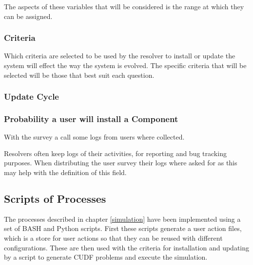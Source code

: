 The aspects of these variables that will be considered is the range at which they can be assigned.

\subsubsection{Criteria}
Which criteria are selected to be used by the resolver to install or update the system will effect the way the system is evolved.
The specific criteria that will be selected will be those that best suit each question. 


\subsubsection{Update Cycle}



\subsubsection{Probability a user will install a Component}

With the survey a call some logs from users where collected.


Resolvers often keep logs of their activities, for reporting and bug tracking purposes.
When distributing the user survey their logs where asked for as this may help with the definition of this field.


\subsection{Scripts of Processes}
The processes described in chapter \ref{simulation} have been implemented using a set of BASH and Python scripts.
First these scripts generate a user action files, which is a store for user actions so that they can be reused with different configurations.
These are then used with the criteria for installation and updating by a script to generate CUDF problems and execute the simulation.

